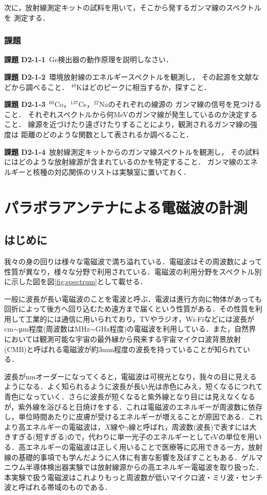 \documentclass[a4j,10pt,oneside,openany]{jsbook}
\begin{document}
{次に，放射線測定キットの試料を用いて，そこから発するガンマ線のスペクトルを
測定する．

\subsubsection{課題}

{\bf 課題 D2-1-1}~Ge検出器の動作原理を説明しなさい．

{\bf 課題 D2-1-2}~環境放射線のエネルギースペクトルを観測し，
その起源を文献などから調べること．
$^{40}$Kはどのピークに相当するか，探すこと．

{\bf 課題 D2-1-3}~$^{60}$Co，$^{137}$Cs，$^{22}$Naのそれぞれの線源の
ガンマ線の信号を見つけること．
それぞれスペクトルから何MeVのガンマ線が発生しているのか決定すること．
線源を近づけたり遠ざけたりすることにより，観測されるガンマ線の強度は
距離のどのような関数として表されるか調べること．

{\bf 課題 D2-1-4}~放射線測定キットからのガンマ線スペクトルを観測し，
その試料にはどのような放射線源が含まれているのかを特定すること．
ガンマ線のエネルギーと核種の対応関係のリストは実験室に置いておく．

\newpage
%
%

\section{パラボラアンテナによる電磁波の計測}
\subsection{はじめに}
我々の身の回りは様々な電磁波で満ち溢れている．電磁波はその周波数によって性質が異なり，様々な分野で利用されている．電磁波の利用分野をスペクトル別に示した図を図\ref{fig:spectrum}として載せる．

一般に波長が長い電磁波のことを電波と呼ぶ．電波は進行方向に物体があっても回折によって後方へ回り込むため遠方まで届くという性質がある．その性質を利用して工業的には通信に用いられており，TVやラジオ，Wi-Fiなどには波長がcm$\sim$\si{\micro m}程度(周波数はMHz$\sim$GHz程度)の電磁波を利用している．また，自然界においては観測可能な宇宙の最外縁から飛来する宇宙マイクロ波背景放射(CMB)と呼ばれる電磁波が約3mm程度の波長を持っていることが知られている．

波長がnmオーダーになってくると，電磁波は可視光となり，我々の目に見えるようになる．よく知られるように波長が長い光は赤色にみえ，短くなるにつれて青色になっていく．さらに波長が短くなると紫外線となり目には見えなくなるが，紫外線を浴びると日焼けをする．これは電磁波のエネルギーが周波数に依存し，単位時間あたりに皮膚が受けるエネルギーが増えることが原因である．これより高エネルギーの電磁波は，$X$線や$\gamma$線と呼ばれ，周波数(波長)で表すには大きすぎる(短すぎる)ので，代わりに単一光子のエネルギーとしてeVの単位を用いる．高エネルギーの電磁波は正しく用いることで医療等に応用できる一方，放射線の基礎的事項でも学んだように人体に有害な影響を及ぼすこともある．ゲルマニウム半導体検出器実験では放射線源からの高エネルギー電磁波を取り扱った．本実験で扱う電磁波はこれよりもっと周波数が低いマイクロ波・ミリ波・センチ波と呼ばれる帯域のものである．

}
\end{document}
